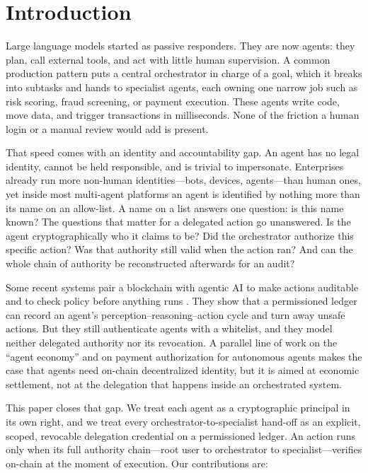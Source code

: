 \documentclass[conference]{IEEEtran}
\begin{document}
\section{Introduction}
Large language models started as passive responders. They are now agents: they plan, call external tools, and act with little human supervision. A common production pattern puts a central orchestrator in charge of a goal, which it breaks into subtasks and hands to specialist agents, each owning one narrow job such as risk scoring, fraud screening, or payment execution. These agents write code, move data, and trigger transactions in milliseconds. None of the friction a human login or a manual review would add is present.

That speed comes with an identity and accountability gap. An agent has no legal identity, cannot be held responsible, and is trivial to impersonate. Enterprises already run more non-human identities---bots, devices, agents---than human ones, yet inside most multi-agent platforms an agent is identified by nothing more than its name on an allow-list. A name on a list answers one question: is this name known? The questions that matter for a delegated action go unanswered. Is the agent cryptographically who it claims to be? Did the orchestrator authorize this specific action? Was that authority still valid when the action ran? And can the whole chain of authority be reconstructed afterwards for an audit?

Some recent systems pair a blockchain with agentic AI to make actions auditable and to check policy before anything runs \cite{jan2025}. They show that a permissioned ledger can record an agent's perception--reasoning--action cycle and turn away unsafe actions. But they still authenticate agents with a whitelist, and they model neither delegated authority nor its revocation. A parallel line of work on the ``agent economy'' \cite{xu2026} and on payment authorization for autonomous agents \cite{tiva2025} makes the case that agents need on-chain decentralized identity, but it is aimed at economic settlement, not at the delegation that happens inside an orchestrated system.

This paper closes that gap. We treat each agent as a cryptographic principal in its own right, and we treat every orchestrator-to-specialist hand-off as an explicit, scoped, revocable delegation credential on a permissioned ledger. An action runs only when its full authority chain---root user to orchestrator to specialist---verifies on-chain at the moment of execution. Our contributions are:
\end{document}
